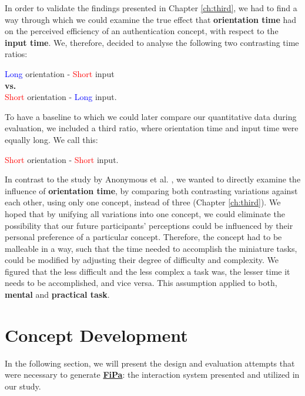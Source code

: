 In order to validate the findings presented in Chapter \ref{ch:third}, we had to find a way through which we could examine the true effect that \textbf{orientation time} had on the perceived efficiency of an authentication concept, with respect to the \textbf{input time}. We, therefore, decided to analyse the following two contrasting time ratios: 
\begin{center}
    \textcolor{blue}{Long} orientation - \textcolor{red}{Short} input \\
    \textbf{vs.} \\
    \textcolor{red}{Short} orientation - \textcolor{blue}{Long} input.
\end{center} 

To have a baseline to which we could later compare our quantitative data during evaluation, we included a third ratio, where orientation time and input time were equally long. We call this:  
\begin{center}
\textcolor{red}{Short} orientation - \textcolor{red}{Short} input.
\end{center} 

In contrast to the study by Anonymous et al. \cite{anonymous}, we wanted to directly examine the influence of \textbf{orientation time}, by comparing both contrasting variations against each other, using only one concept, instead of three (Chapter \ref{ch:third}). We hoped that by unifying all variations into one concept, we could eliminate the possibility that our future participants' perceptions could be influenced by their personal preference of a particular concept. Therefore, the concept had to be malleable in a way, such that the time needed to accomplish the miniature tasks, could be modified by adjusting their degree of difficulty and complexity. We figured that the less difficult and the less complex a task was, the lesser time it needs to be accomplished, and vice versa. This assumption applied to both, \textbf{mental} and \textbf{practical task}.

\section{Concept Development} \label{4.2}

In the following section, we will present the design and evaluation attempts that were necessary to generate \underline{\textbf{FiPa}}: the interaction system presented and utilized in our study. 

